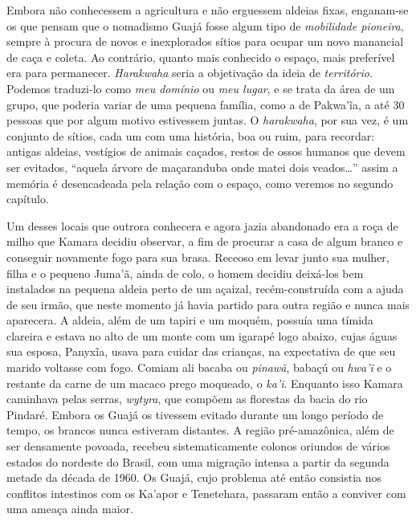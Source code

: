 Embora não conhecessem a agricultura e não erguessem aldeias fixas,
enganam-se os que pensam que o nomadismo Guajá fosse algum tipo de
\textit{mobilidade pioneira}, sempre à procura de novos e inexplorados sítios
para ocupar um novo manancial de caça e coleta. Ao contrário, quanto
mais conhecido o espaço, mais preferível era para permanecer.
\textit{Harakwaha} seria a objetivação da ideia de \textit{território}. Podemos
traduzi-lo como \textit{meu domínio} ou \textit{meu lugar}, e se trata da área de
um grupo, que poderia variar de uma pequena família, como a de Pakwa'ĩa,
a até 30 pessoas que por algum motivo estivessem juntas. O
\textit{harakwaha}, por sua vez, é um conjunto de sítios, cada um com uma
história, boa ou ruim, para recordar: antigas aldeias, vestígios de
animais caçados, restos de ossos humanos que devem ser evitados,
``aquela árvore de maçaranduba onde matei dois veados\ldots{}'' assim a
memória é desencadeada pela relação com o espaço, como veremos no
segundo capítulo.

Um desses locais que outrora conhecera e agora jazia abandonado era a roça
de milho que Kamara decidiu observar, a fim de procurar a casa de algum
branco e conseguir novamente fogo para sua brasa. Receoso em
levar junto sua mulher, filha e o pequeno Juma'ã, ainda de colo, o homem
decidiu deixá-los bem instalados na pequena aldeia perto de um açaizal,
recém-construída com a ajuda de seu irmão, que neste momento já havia
partido para outra região e nunca mais aparecera. A aldeia, além de um
tapiri e um moquém, possuía uma tímida clareira e estava no alto de um
monte com um igarapé logo abaixo, cujas águas sua esposa, Panyxĩa, usava
para cuidar das crianças, na expectativa de que seu marido voltasse com
fogo. Comiam ali bacaba ou \textit{pinawã}, babaçú ou \textit{hwa'ĩ} e o
restante da carne de um macaco prego moqueado, o \textit{ka'i}. Enquanto
isso Kamara caminhava pelas serras, \textit{wytyra}, que compõem as
florestas da bacia do rio Pindaré. Embora os Guajá os tivessem evitado
durante um longo período de tempo, os brancos nunca estiveram
distantes. A região pré-amazônica, além de ser densamente povoada,
recebeu sistematicamente colonos oriundos de vários estados do nordeste
do Brasil, com uma migração intensa a partir da segunda metade da década
de 1960. Os Guajá, cujo problema até então consistia nos conflitos
intestinos com os Ka'apor e Tenetehara, passaram então a conviver com
uma ameaça ainda maior.


